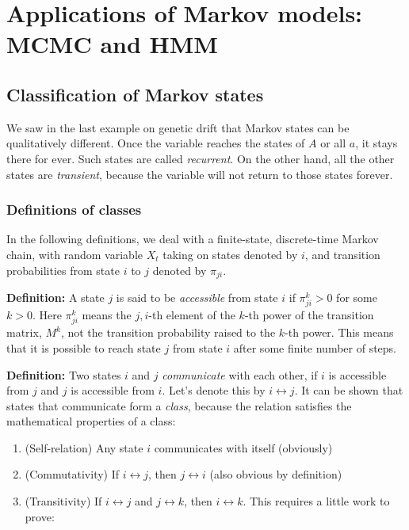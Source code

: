 \documentclass[11pt]{book}
\begin{document}
\setcounter{chapter}{5}
\chapter[Applications of Markov models]{Applications of Markov models: MCMC and HMM}

\section{Classification of Markov states}
We saw in the last example on genetic drift that Markov states can be qualitatively different. Once the variable reaches the states of $A$ or all $a$, it stays there for ever. Such states are called \emph{recurrent}. On the other hand, all the other states are \emph{transient}, because the variable will not return to those states forever. 

\subsection{Definitions of classes}
In the following definitions, we deal with a finite-state, discrete-time Markov chain, with random variable $X_t$ taking on states denoted by $i$, and transition probabilities from state $i$ to $j$ denoted by $\pi_{ji}$.

\textbf{Definition:} A state $j$ is said to be \emph{accessible} from state $i$ if $\pi_{ji}^k > 0$ for some $k > 0$. Here $\pi_{ji}^k $ means the $j,i$-th element of the $k$-th power of the transition matrix, $M^k$, not the transition probability raised to the $k$-th power. This means that it is possible to reach state $j$ from state $i$ after some finite number of steps. 

\textbf{Definition:} Two states $i$ and $j$ \emph{communicate} with each other, if $i$ is accessible from $j$ and $j$ is accessible from $i$. Let's denote this by $i \leftrightarrow j$. It can be shown that states that communicate form a \emph{class}, because the relation satisfies the mathematical properties of a class:
\begin{enumerate}

\item (Self-relation) Any state $i$ communicates with itself (obviously)
\item (Commutativity) If $i \leftrightarrow j$, then $j \leftrightarrow i$ (also obvious by definition)
\item (Transitivity) If $i \leftrightarrow j$ and $j \leftrightarrow k$, then $i \leftrightarrow k$. This requires a little work to prove:

\end{enumerate}
\end{document}
